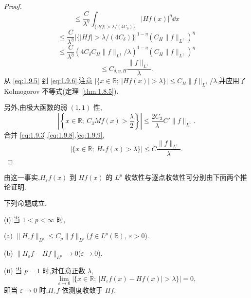 \begin{proof}
\begin{equation}
\leq \frac{C}{\lambda^{\eta}}\int_{\{|Hf| > \lambda/(4C_{\delta})\}}|Hf(x)|^{\eta}\dd x
\label{eq:1.9.5}\end{equation}
\begin{equation}\tag{1.9.6}
\leq \frac{C}{\lambda^{\eta}}\left|\{|Hf| > \lambda/(4C_{\delta})\}\right|^{1-\eta}(C_{H}\| f \|_{L^{1}})^{\eta}
\label{eq:1.9.6}\end{equation}
\begin{equation}\tag{1.9.7}
\leq \frac{C}{\lambda^{\eta}}\left(4C_{\delta}C_{H}\| f \|_{L^{1}}/\lambda\right)^{1-\eta}(C_{H}\| f \|_{L^{1}})^{\eta}
\label{eq:1.9.7}\end{equation}
\begin{equation}\tag{1.9.8}
\leq C_{\delta,\eta,H}\frac{\| f \|_{L^{1}}}{\lambda}.
\label{eq:1.9.8}\end{equation}
从 \eqref{eq:1.9.5} 到 \eqref{eq:1.9.6},注意 $|\{x \in \mathbb{R};\ |Hf(x)| > \lambda\}| \leq C_{H}\| f \|_{L^{1}}/\lambda$,并应用了 Kolmogorov 不等式(定理~\ref{thm:1.8.5}).

另外,由极大函数的弱 $(1,1)$ 性,
\begin{equation}\tag{1.9.9}
\left|\left\{x \in \mathbb{R};\ C_{3}Mf(x) > \frac{\lambda}{2}\right\}\right| \leq \frac{2C_{3}}{\lambda}C'\| f \|_{L^{1}}.
\label{eq:1.9.9}\end{equation}
合并 \eqref{eq:1.9.3},\eqref{eq:1.9.8},\eqref{eq:1.9.9},
\begin{equation*}
|\{x \in \mathbb{R};\ H_{*}f(x) > \lambda\}| \leq C\frac{\| f \|_{L^{1}}}{\lambda}.
\end{equation*}
\end{proof}

由这一事实,$H_{\varepsilon}f(x)$ 到 $Hf(x)$ 的 $L^{p}$ 收敛性与逐点收敛性可分别由下面两个推论证明.

\begin{corollary}\label{cor:1.9.3}
下列命题成立.

(i) 当 $1 < p < \infty$ 时,

(a) $\| H_{\varepsilon}f \|_{L^{p}} \leq C_{p}\| f \|_{L^{p}}$($f \in L^{p}(\mathbb{R}),\ \varepsilon > 0$).

(b) $\| H_{\varepsilon}f - Hf \|_{L^{p}} \to 0$($\varepsilon \to 0$).

(ii) 当 $p = 1$ 时,对任意正数 $\lambda$,
\begin{equation*}
\lim_{\varepsilon \to 0}|\{x \in \mathbb{R};\ |H_{\varepsilon}f(x) - Hf(x)| > \lambda\}| = 0,
\end{equation*}
即当 $\varepsilon \to 0$ 时,$H_{\varepsilon}f$ 依测度收敛于 $Hf$.
\end{corollary}

